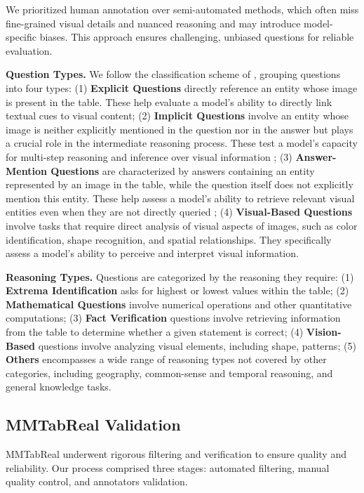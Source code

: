 \documentclass[11pt]{article}
\newcommand{\datasetName}{{\sc MMTabReal}\xspace}
\begin{document}
We prioritized human annotation over semi-automated methods, which often miss fine-grained visual details and nuanced reasoning and may introduce model-specific biases. This approach ensures challenging, unbiased questions for reliable evaluation.

\noindent
\textbf{Question Types.} We follow the classification scheme of \cite{mathur-etal-2024-knowledge}, grouping questions into four types: (1) \textbf{Explicit Questions} directly reference an entity whose image is present in the table. These help evaluate a model’s ability to directly link textual cues to visual content; (2) \textbf{Implicit Questions} involve an entity whose image is neither explicitly mentioned in the question nor in the answer but plays a crucial role in the intermediate reasoning process. These test a model’s capacity for multi-step reasoning and inference over visual information ; (3) \textbf{Answer-Mention Questions} are characterized by answers containing an entity represented by an image in the table, while the question itself does not explicitly mention this entity. These help assess a model’s ability to retrieve relevant visual entities even when they are not directly queried ; (4) \textbf{Visual-Based Questions} involve tasks that require direct analysis of visual aspects of images, such as color identification, shape recognition, and spatial relationships. They specifically assess a model’s ability to perceive and interpret visual information.

\noindent
\textbf{Reasoning Types.} Questions are categorized by the reasoning they require: (1) \textbf{Extrema Identification} asks for highest or lowest values within the table; (2) \textbf{Mathematical Questions} involve numerical operations and other quantitative computations; (3) \textbf{Fact Verification} questions involve retrieving information from the table to determine whether a given statement is correct; (4) \textbf{Vision-Based} questions involve analyzing visual elements, including shape, patterns; (5) \textbf{Others} encompasses a wide range of reasoning types not covered by other categories, including geography, common-sense and temporal reasoning, and general knowledge tasks.
\subsection{\datasetName Validation}

\datasetName underwent rigorous filtering and verification to ensure quality and reliability. Our process comprised three stages: automated filtering, manual quality control, and annotators validation.
\vspace{-0.3em}
\end{document}
